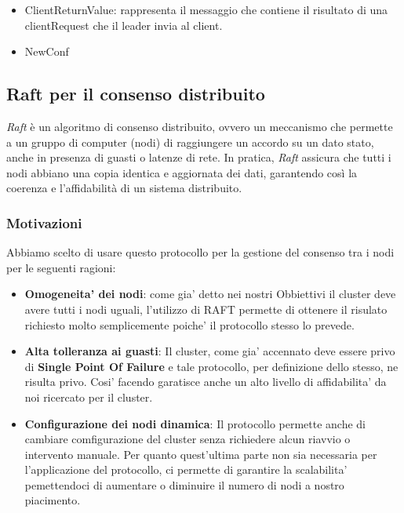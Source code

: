 \begin{itemize}
  \item ClientReturnValue: rappresenta il messaggio che contiene il risultato di una clientRequest che il leader 
    invia al client. 

  \item NewConf 
\end{itemize}

\subsection{Raft per il consenso distribuito}
\textit{Raft} è un algoritmo di consenso distribuito, ovvero un meccanismo che permette 
a un gruppo di computer (nodi) di raggiungere un accordo su un dato stato, 
anche in presenza di guasti o latenze di rete. In pratica, 
\textit{Raft} assicura che tutti i nodi abbiano una copia identica e 
aggiornata dei dati, garantendo così la coerenza e l'affidabilità di un sistema distribuito.

\subsubsection{Motivazioni}
Abbiamo scelto di usare questo protocollo per la gestione del consenso tra i nodi per
le seguenti ragioni:
\begin{itemize}
    \item \textbf{Omogeneita' dei nodi}: 
        come gia' detto nei nostri Obbiettivi il cluster deve avere tutti i nodi uguali, 
        l'utilizzo di RAFT permette di ottenere il risulato richiesto molto semplicemente poiche'
        il protocollo stesso lo prevede.
    \item \textbf{Alta tolleranza ai guasti}: 
        Il cluster, come gia' accennato deve essere privo di \textbf{Single Point Of Failure} e
        tale protocollo, per definizione dello stesso, ne risulta privo. 
        Cosi' facendo garatisce anche un alto livello di affidabilita' da noi ricercato per il 
        cluster.
    \item \textbf{Configurazione dei nodi dinamica}: 
        Il protocollo permette anche di cambiare comfigurazione del cluster senza richiedere
        alcun riavvio o intervento manuale. Per quanto quest'ultima
        parte non sia necessaria per l'applicazione del protocollo, ci permette di garantire
        la scalabilita' pemettendoci di aumentare o diminuire il numero di 
        nodi a nostro piacimento.
\end{itemize}

